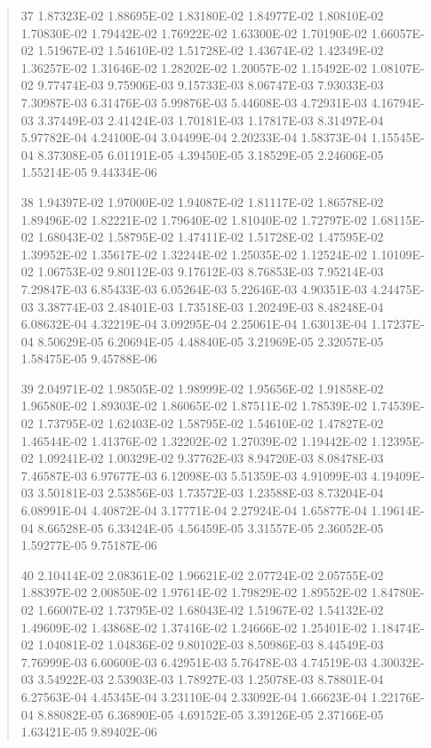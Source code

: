 \documentclass[letterpaper,10pt,english]{sphinxmanual}
\begin{document}
\begin{quote}
\begin{DUlineblock}{0em}
\item[] 37   1.87323E-02  1.88695E-02  1.83180E-02  1.84977E-02  1.80810E-02  1.70830E-02  1.79442E-02  1.76922E-02  1.63300E-02  1.70190E-02  1.66057E-02  1.51967E-02  1.54610E-02  1.51728E-02  1.43674E-02  1.42349E-02  1.36257E-02  1.31646E-02  1.28202E-02  1.20057E-02  1.15492E-02  1.08107E-02  9.77474E-03  9.75906E-03  9.15733E-03  8.06747E-03  7.93033E-03  7.30987E-03  6.31476E-03  5.99876E-03  5.44608E-03  4.72931E-03  4.16794E-03  3.37449E-03  2.41424E-03  1.70181E-03  1.17817E-03  8.31497E-04  5.97782E-04  4.24100E-04  3.04499E-04  2.20233E-04  1.58373E-04  1.15545E-04  8.37308E-05  6.01191E-05  4.39450E-05  3.18529E-05  2.24606E-05  1.55214E-05  9.44334E-06
\item[] 38   1.94397E-02  1.97000E-02  1.94087E-02  1.81117E-02  1.86578E-02  1.89496E-02  1.82221E-02  1.79640E-02  1.81040E-02  1.72797E-02  1.68115E-02  1.68043E-02  1.58795E-02  1.47411E-02  1.51728E-02  1.47595E-02  1.39952E-02  1.35617E-02  1.32244E-02  1.25035E-02  1.12524E-02  1.10109E-02  1.06753E-02  9.80112E-03  9.17612E-03  8.76853E-03  7.95214E-03  7.29847E-03  6.85433E-03  6.05264E-03  5.22646E-03  4.90351E-03  4.24475E-03  3.38774E-03  2.48401E-03  1.73518E-03  1.20249E-03  8.48248E-04  6.08632E-04  4.32219E-04  3.09295E-04  2.25061E-04  1.63013E-04  1.17237E-04  8.50629E-05  6.20694E-05  4.48840E-05  3.21969E-05  2.32057E-05  1.58475E-05  9.45788E-06
\item[] 39   2.04971E-02  1.98505E-02  1.98999E-02  1.95656E-02  1.91858E-02  1.96580E-02  1.89303E-02  1.86065E-02  1.87511E-02  1.78539E-02  1.74539E-02  1.73795E-02  1.62403E-02  1.58795E-02  1.54610E-02  1.47827E-02  1.46544E-02  1.41376E-02  1.32202E-02  1.27039E-02  1.19442E-02  1.12395E-02  1.09241E-02  1.00329E-02  9.37762E-03  8.94720E-03  8.08478E-03  7.46587E-03  6.97677E-03  6.12098E-03  5.51359E-03  4.91099E-03  4.19409E-03  3.50181E-03  2.53856E-03  1.73572E-03  1.23588E-03  8.73204E-04  6.08991E-04  4.40872E-04  3.17771E-04  2.27924E-04  1.65877E-04  1.19614E-04  8.66528E-05  6.33424E-05  4.56459E-05  3.31557E-05  2.36052E-05  1.59277E-05  9.75187E-06
\item[] 40   2.10414E-02  2.08361E-02  1.96621E-02  2.07724E-02  2.05755E-02  1.88397E-02  2.00850E-02  1.97614E-02  1.79829E-02  1.89552E-02  1.84780E-02  1.66007E-02  1.73795E-02  1.68043E-02  1.51967E-02  1.54132E-02  1.49609E-02  1.43868E-02  1.37416E-02  1.24666E-02  1.25401E-02  1.18474E-02  1.04081E-02  1.04836E-02  9.80102E-03  8.50986E-03  8.44549E-03  7.76999E-03  6.60600E-03  6.42951E-03  5.76478E-03  4.74519E-03  4.30032E-03  3.54922E-03  2.53903E-03  1.78927E-03  1.25078E-03  8.78801E-04  6.27563E-04  4.45345E-04  3.23110E-04  2.33092E-04  1.66623E-04  1.22176E-04  8.88082E-05  6.36890E-05  4.69152E-05  3.39126E-05  2.37166E-05  1.63421E-05  9.89402E-06

\end{DUlineblock}
\end{quote}
\end{document}
